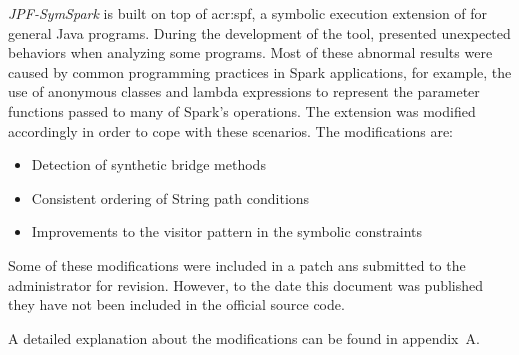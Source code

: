 \textit{JPF-SymSpark} is built on top of \acrfull{acr:spf}, a symbolic execution extension of \jpf{} for general Java programs. During the development of the tool, \spf{} presented unexpected behaviors when analyzing some programs. Most of these abnormal results were caused by common programming practices in Spark applications, for example, the use of anonymous classes and lambda expressions to represent the parameter functions passed to many of Spark's operations. The \spf{} extension was modified accordingly in order to cope with these scenarios. The modifications \spf{} are:

\begin{itemize}
	\item Detection of synthetic bridge methods
	\item Consistent ordering of String path conditions
	\item Improvements to the visitor pattern in the symbolic constraints
\end{itemize}

Some of these modifications were included in a patch ans submitted to the \spf{} administrator for revision. However, to the date this document was published they have not been included in the official source code.

A detailed explanation about the modifications can be found in appendix~A.